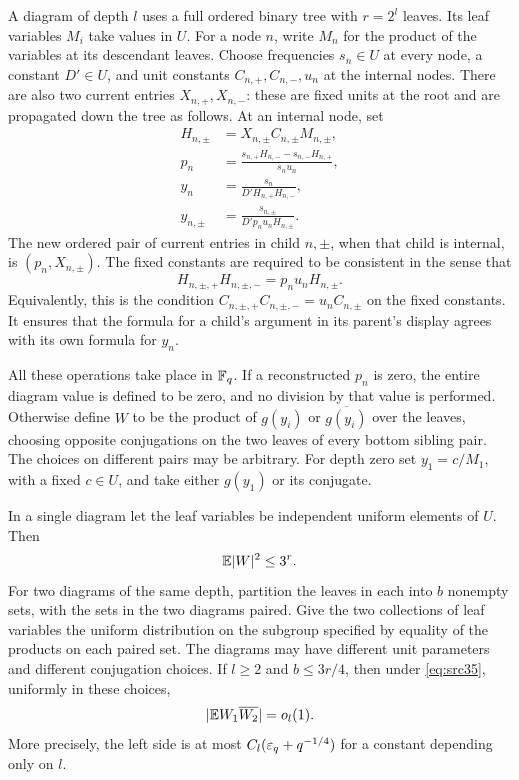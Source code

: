 A diagram of depth $l$ uses a full ordered binary tree with $r=2^l$
leaves.  Its leaf variables $M_i$ take values in $U$.  For a node $n$,
write $M_n$ for the product of the variables at its descendant leaves.
Choose frequencies $s_n\in U$ at every node, a constant $D'\in U$, and
unit constants $C_{n,+},C_{n,-},u_n$ at the internal nodes.  There are
also two current entries $X_{n,+},X_{n,-}$: these are fixed units at the
root and are propagated down the tree as follows.  At an internal node,
set
\begin{equation}\label{eq:src36}
 \begin{split}
 H_{n,\pm}&=X_{n,\pm}C_{n,\pm}M_{n,\pm},\\
 p_n&=\frac{s_{n,+}H_{n,-}-s_{n,-}H_{n,+}}{s_nu_n},\\
 y_n&=\frac{s_n}{D'H_{n,+}H_{n,-}},\\
 y_{n,\pm}&=\frac{s_{n,\pm}}{D'p_nu_nH_{n,\pm}}.
 \end{split}
\end{equation}
The new ordered pair of current entries in child $n,\pm$, when that child
is internal, is $(p_n,X_{n,\pm})$.  The fixed constants are required to
be consistent in the sense that
\[
 H_{n,\pm,+}H_{n,\pm,-}=p_nu_nH_{n,\pm}.
\]
Equivalently, this is the condition
$C_{n,\pm,+}C_{n,\pm,-}=u_nC_{n,\pm}$ on the fixed constants.
It ensures that the formula for a child's argument in its parent's
display agrees with its own formula for $y_n$.

All these operations take place in $\mathbb F_q$.  If a reconstructed $p_n$ is
zero, the entire diagram value is defined to be zero, and no division
by that value is performed.  Otherwise define $W$ to be the product of
$g(y_i)$ or $\overline{g(y_i)}$ over the leaves, choosing opposite
conjugations on the two leaves of every bottom sibling pair.  The choices
on different pairs may be arbitrary.  For depth zero set
$y_1=c/M_1$, with a fixed $c\in U$, and take either $g(y_1)$ or its
conjugate.

\begin{lemma}\label{lem:tree-comparison}
In a single diagram let the leaf variables be independent uniform
elements of $U$.  Then
\begin{equation}\label{eq:src37}
                       \mathbb E|W|^2\leq3^r.
\end{equation}
For two diagrams of the same depth, partition the leaves in each into
$b$ nonempty sets, with the sets in the two diagrams paired.  Give the
two collections of leaf variables the uniform distribution on the
subgroup specified by equality of the products on each paired set.
The diagrams may have different unit parameters and different
conjugation choices.  If $l\geq2$ and $b\leq3r/4$, then under
\eqref{eq:src35}, uniformly in these choices,
\begin{equation}\label{eq:src38}
                         |\mathbb E W_1\overline{W_2}|=o_l(1).
\end{equation}
More precisely, the left side is at most
$C_l(\varepsilon_q+q^{-1/4})$ for a constant depending only on $l$.
\end{lemma}

